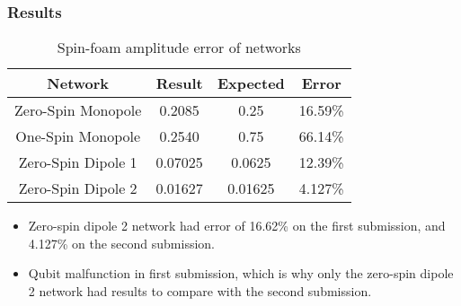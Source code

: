\documentclass{beamer}
\begin{document}
\begin{frame}
    \frametitle{Results}
    \begin{table}[h]
    \begin{centering}
            \begin{tabular}{|c|c|c|c|}
                    \hline
                    \textbf{Network} & \textbf{Result} & \textbf{Expected} & \textbf{Error} \\ \hline
                    Zero-Spin Monopole & 0.2085 & 0.25 & 16.59\% \\ \hline
                    One-Spin Monopole & 0.2540 & 0.75 & 66.14\% \\ \hline
                    Zero-Spin Dipole 1 & 0.07025 & 0.0625 & 12.39\% \\ \hline
                    Zero-Spin Dipole 2 & 0.01627 & 0.01625 & 4.127\% \\ \hline
            \end{tabular}
            \caption{Spin-foam amplitude error of networks}
    \end{centering}
    \end{table}
    \begin{itemize}
        \item Zero-spin dipole 2 network had error of 16.62\% on the first submission, and 4.127\% on the second submission. 
        \bigbreak
        \item Qubit malfunction in first submission, which is why only the zero-spin dipole 2 network had results to compare with the second submission.
    \end{itemize}
    
\end{frame}

\end{document}
